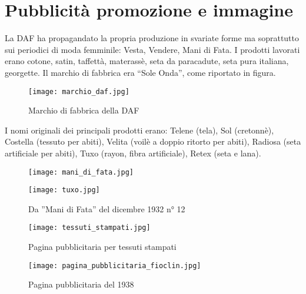 \chapter[]{Pubblicità promozione e immagine}
\graphicspath{ {./images/chapter8/} }

La DAF ha propagandato la propria produzione in svariate forme ma soprattutto sui periodici di moda femminile: Vesta, Vendere, Mani di Fata. I prodotti lavorati erano cotone, satin, taffettà, materassè, seta da paracadute, seta pura italiana, georgette. Il marchio di fabbrica era “Sole Onda”, come riportato in figura. 

\begin{figure}[h]
	\centering
		\texttt{[image: marchio\_daf.jpg]}
	\caption{Marchio di fabbrica della DAF}
	\label{fig:marchio_daf}
\end{figure}

I nomi originali dei principali prodotti erano: Telene (tela), Sol (cretonnè), Costella (tessuto per abiti), Velita (voilè a doppio ritorto per abiti), Radiosa (seta artificiale per abiti), Tuxo (rayon, fibra artificiale), Retex (seta e lana).

\newpage

\begin{figure}[h]
	\centering
		\texttt{[image: mani\_di\_fata.jpg]}
	\caption{}
	\label{fig:mani_di_fata}
\end{figure}

\newpage

\begin{figure}[h]
	\centering
		\texttt{[image: tuxo.jpg]}
	\caption{Da ”Mani di Fata” del dicembre 1932  n° 12}
	\label{fig:tuxo}
\end{figure}

\newpage

\begin{figure}[h]
	\centering
		\texttt{[image: tessuti\_stampati.jpg]}
	\caption{Pagina pubblicitaria per tessuti stampati}
	\label{fig:tessuti_stampati}
\end{figure}

\newpage

\begin{figure}[h]
	\centering
		\texttt{[image: pagina\_pubblicitaria\_fioclin.jpg]}
	\caption{Pagina pubblicitaria del 1938}
	\label{fig:pagina_pubblicitaria_fioclin}
\end{figure}

\newpage

